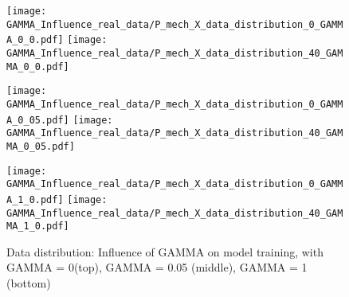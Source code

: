 \begin{comment}
\begin{figure}[H]
  \centering
  \texttt{[image: accuracy\_real\_world]}
  \caption {Accuracies for model training with Regular FC + CNN MMD loss (left), Regular FC MMD (middle) and No MMD loss (right)} \label{fig:accuracy_real_world}
\end{figure}


\begin{figure}[H]
  \centering
  \texttt{[image: loss\_real\_world]}
  \caption {Loss for model training with Regular FC + CNN MMD loss (left), Regular FC MMD (middle) and No MMD loss} \label{fig:loss_real_world}
\end{figure}


In fig. the development of the source domain cross entropy MMD loss is shown. It can be seen, that the hyperparameter GAMMA was picked well, such that the MMD as well as the source cross entropy loss were able to be reduced smoothly throughout the trainings process. 


Unfortunately the MMD loss could just minimize the domain discrepancy by a little. The domain discrepancy problem couldn't be solved completely. Still the idea of the MMD loss becomes more clear in the experiments. Also the positive effect of the MMD loss for the training is obvious. For the complex multi-dimensional dataset the MMD loss is probably not sophisticated enough to detect and effectively fight the domain discrepancy.
\end{comment}

\begin{figure}[H]
  \centering

  \texttt{[image: GAMMA\_Influence\_real\_data/P\_mech\_X\_data\_distribution\_0\_GAMMA\_0\_0.pdf]}
  \hspace{.1cm}
  \texttt{[image: GAMMA\_Influence\_real\_data/P\_mech\_X\_data\_distribution\_40\_GAMMA\_0\_0.pdf]}

  \vspace{.3cm}

  \texttt{[image: GAMMA\_Influence\_real\_data/P\_mech\_X\_data\_distribution\_0\_GAMMA\_0\_05.pdf]}
  \hspace{.1cm}
  \texttt{[image: GAMMA\_Influence\_real\_data/P\_mech\_X\_data\_distribution\_40\_GAMMA\_0\_05.pdf]}

  \vspace{.3cm}

  \texttt{[image: GAMMA\_Influence\_real\_data/P\_mech\_X\_data\_distribution\_0\_GAMMA\_1\_0.pdf]}
  \hspace{.1cm}
  \texttt{[image: GAMMA\_Influence\_real\_data/P\_mech\_X\_data\_distribution\_40\_GAMMA\_1\_0.pdf]}


  \caption{Data distribution: Influence of GAMMA on model training, with GAMMA = 0(top), GAMMA = 0.05 (middle), GAMMA = 1 (bottom)}
  \label{fig:distribution_GAMMA_influence_real_data}
\end{figure}




